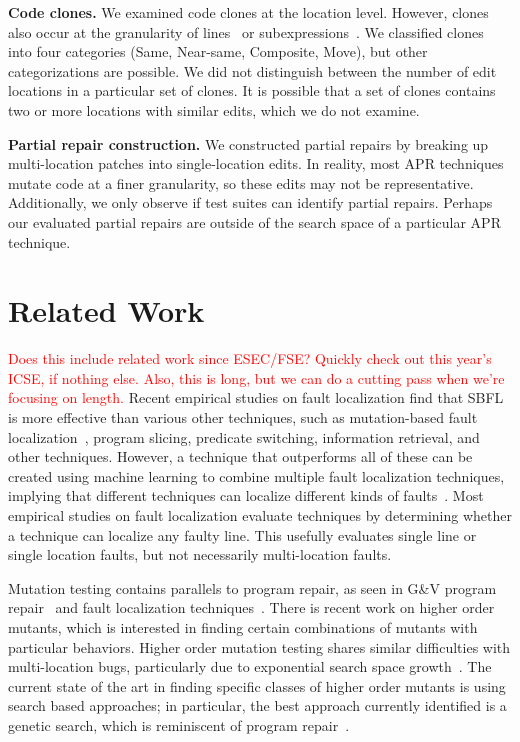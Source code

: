 \documentclass[10pt, conference]{IEEEtran}
\newcommand\todo[1]{\textcolor{red}{#1}}
\begin{document}
\vspace{1ex}
\noindent\textbf{Code clones.}
We examined code clones at the location level.  However, clones also occur at the
granularity of lines~\cite{JiaClones} or
subexpressions~\cite{microclones}. We classified clones into four
categories (Same, Near-same, Composite, Move), but other categorizations 
are possible.
%
We did not distinguish between the number
of edit locations in a particular set of clones. It is possible that a set of
clones contains two or more locations with similar edits, which we do not examine. 

\vspace{1ex}
\noindent\textbf{Partial repair construction.}
We constructed partial repairs by breaking up multi-location patches
into single-location edits.
In reality, most APR techniques mutate code at a finer granularity, so
these edits may not be representative.  Additionally, we only observe if test suites
can identify partial repairs. Perhaps our evaluated partial repairs
are outside of the search space of a
particular APR technique.

\section{Related Work}
\label{sec:related}

\todo{Does this include related work since ESEC/FSE?  Quickly check out this
  year's ICSE, if nothing else.}
\todo{Also, this is long, but we can do a cutting pass when we're focusing on length.}
Recent empirical studies on fault localization find that 
SBFL is more effective than various other techniques, such as 
mutation-based fault localization~\cite{pearson2017evaluating, mut-analysis}, program 
slicing, predicate switching,  information retrieval, and other techniques. 
However, a 
technique that outperforms all of these can be created using machine learning to combine 
multiple fault localization techniques, implying that different techniques can 
localize different kinds of faults~\cite{zou2019empirical}. Most empirical 
studies on fault localization evaluate techniques by determining whether a 
technique can localize any faulty line. This usefully evaluates single line or single 
location faults, but not necessarily multi-location faults.

Mutation testing contains parallels to program repair, as seen in G\&V
program repair~\cite{weimer2013leveraging} and fault 
localization techniques~\cite{metallaxis,muse,mbfl-survey}. 
There is recent work on higher order mutants, which is interested in finding 
certain combinations of mutants with particular behaviors. Higher order mutation testing 
shares similar difficulties with multi-location bugs, particularly due to 
exponential search space growth~\cite{long-search-spaces}. 
The current state of the art in finding specific classes of 
higher order mutants is using search based approaches; in particular, the best approach 
currently identified is a genetic search, which is reminiscent of program repair~\cite{homs, 
genprog}.
\end{document}
